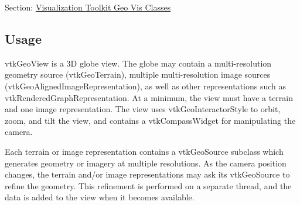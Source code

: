 Section\-: \hyperlink{sec_vtkgeovis}{Visualization Toolkit Geo Vis Classes} \hypertarget{vtkwidgets_vtkxyplotwidget_Usage}{}\subsection{Usage}\label{vtkwidgets_vtkxyplotwidget_Usage}
vtk\-Geo\-View is a 3\-D globe view. The globe may contain a multi-\/resolution geometry source (vtk\-Geo\-Terrain), multiple multi-\/resolution image sources (vtk\-Geo\-Aligned\-Image\-Representation), as well as other representations such as vtk\-Rendered\-Graph\-Representation. At a minimum, the view must have a terrain and one image representation. The view uses vtk\-Geo\-Interactor\-Style to orbit, zoom, and tilt the view, and contains a vtk\-Compass\-Widget for manipulating the camera.

Each terrain or image representation contains a vtk\-Geo\-Source subclass which generates geometry or imagery at multiple resolutions. As the camera position changes, the terrain and/or image representations may ask its vtk\-Geo\-Source to refine the geometry. This refinement is performed on a separate thread, and the data is added to the view when it becomes available.

